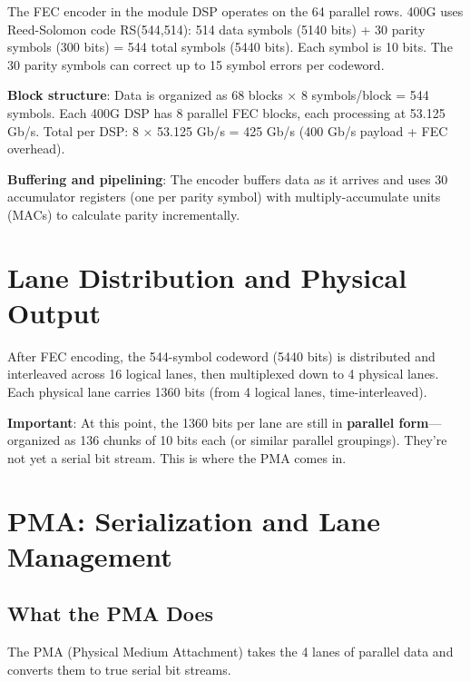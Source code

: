 \documentclass[openany]{tufte-book}
\begin{document}
The FEC encoder in the module DSP operates on the 64 parallel rows. 400G uses Reed-Solomon code RS(544,514): 514 data symbols (5140 bits) + 30 parity symbols (300 bits) = 544 total symbols (5440 bits). Each symbol is 10 bits. The 30 parity symbols can correct up to 15 symbol errors per codeword.

\textbf{Block structure}: Data is organized as 68 blocks × 8 symbols/block = 544 symbols. Each 400G DSP has 8 parallel FEC blocks, each processing at 53.125 Gb/s. Total per DSP: 8 × 53.125 Gb/s = 425 Gb/s (400 Gb/s payload + FEC overhead).

\textbf{Buffering and pipelining}: The encoder buffers data as it arrives and uses 30 accumulator registers (one per parity symbol) with multiply-accumulate units (MACs) to calculate parity incrementally.



\section{Lane Distribution and Physical Output}

After FEC encoding, the 544-symbol codeword (5440 bits) is distributed and interleaved across 16 logical lanes, then multiplexed down to 4 physical lanes. Each physical lane carries 1360 bits (from 4 logical lanes, time-interleaved).

\textbf{Important}: At this point, the 1360 bits per lane are still in \textbf{parallel form}---organized as 136 chunks of 10 bits each (or similar parallel groupings). They're not yet a serial bit stream. This is where the PMA comes in.

\section{PMA: Serialization and Lane Management}

\subsection{What the PMA Does}

The PMA (Physical Medium Attachment) takes the 4 lanes of parallel data and converts them to true serial bit streams.
\end{document}
